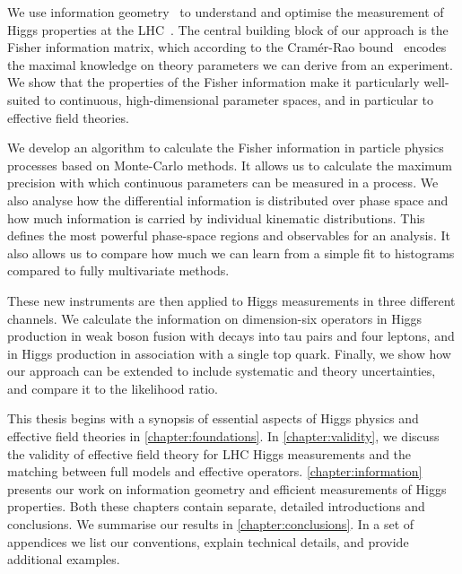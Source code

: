 %
We use information geometry~\cite{efron1975, amari1982, amari2000joho}
to understand and optimise the measurement of Higgs properties at the
LHC~\cite{Brehmer:2016nyr}.
%
The central building block of our approach is the Fisher information
matrix, which according to the Cram\'er-Rao bound~\cite{Rao:1945,
  Cramer:1946} encodes the maximal knowledge on theory parameters we
can derive from an experiment. We show that the properties of the
Fisher information make it particularly well-suited to continuous,
high-dimensional parameter spaces, and in particular to effective
field theories.

We develop an algorithm to calculate the Fisher information in
particle physics processes based on Monte-Carlo methods. It allows us
to calculate the maximum precision with which continuous parameters
can be measured in a process. We also analyse how the differential
information is distributed over phase space and how much information
is carried by individual kinematic distributions. This defines the
most powerful phase-space regions and observables for an analysis. It
also allows us to compare how much we can learn from a simple fit to
histograms compared to fully multivariate methods.

These new instruments are then applied to Higgs measurements in three
different channels. We calculate the information on dimension-six
operators in Higgs production in weak boson fusion with decays into
tau pairs and four leptons, and in Higgs production in association
with a single top quark. Finally, we show how our approach can be
extended to include systematic and theory uncertainties, and compare
it to the likelihood ratio.

\newparagraph
%
This thesis begins with a synopsis of essential aspects of Higgs
physics and effective field theories in
\autoref{chapter:foundations}. In \autoref{chapter:validity}, we
discuss the validity of effective field theory for LHC Higgs
measurements and the matching between full models and effective
operators. \autoref{chapter:information} presents our work on
information geometry and efficient measurements of Higgs
properties. Both these chapters contain separate, detailed
introductions and conclusions. We summarise our results in
\autoref{chapter:conclusions}. In a set of appendices we list our
conventions, explain technical details, and provide additional
examples.

